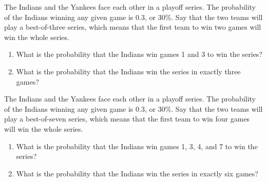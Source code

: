 \documentclass{ximera}
\begin{document}
\begin{problem}
The Indians and the Yankees face each other in a playoff series.  The probability of the Indians winning any given game is 0.3, or 30\%.  Say that the two teams will play a best-of-three series, which means that the first team to win two games will win the whole series.

\begin{enumerate}
\item What is the probability that the Indians win games 1 and 3 to win the series?
\item What is the probability that the Indians win the series in exactly three games?
\end{enumerate}
\end{problem}
\vfill
\begin{problem}
The Indians and the Yankees face each other in a playoff series.  The probability of the Indians winning any given game is 0.3, or 30\%.  Say that the two teams will play a best-of-seven series, which means that the first team to win four games will win the whole series.

\begin{enumerate}
\item What is the probability that the Indians win games 1, 3, 4, and 7 to win the series?
\item What is the probability that the Indians win the series in exactly six games?
\end{enumerate}
\end{problem}
\vfill

\newpage
\end{document}
